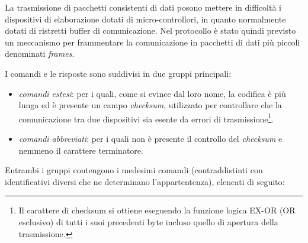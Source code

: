 La trasmissione di pacchetti consistenti di dati posono mettere in difficolt\`a i dispositivi di elaborazione dotati di
micro-controllori, in quanto normalmente dotati di ristretti buffer di comunicazione. Nel protocollo \`e stato
quindi previsto un meccanismo per frammentare la comunicazione in pacchetti di dati pi\`u piccoli denominati
\emph{frames}.

I comandi e le risposte sono suddivisi in due gruppi principali:
\begin{itemize}
\item \emph{comandi estesi}: per i quali, come si evince dal loro nome, la codifica \`e pi\`u lunga ed
\`e presente un campo \emph{checksum}, utilizzato per controllare che la comunicazione tra due dispositivi
sia esente da errori di trasmissione\footnote{Il carattere di checksum si ottiene eseguendo la funzione logica EX-OR (OR esclusivo)
di tutti i suoi precedenti byte incluso quello di apertura della trasmissione.}.
\item \emph{comandi abbreviati}: per i quali non \`e presente il controllo del \emph{checksum} e nemmeno
il carattere terminatore.
\end{itemize}
Entrambi i gruppi contengono i medesimi comandi (contraddistinti con identificativi diversi che ne determinano l'appartentenza),
elencati di seguito:
